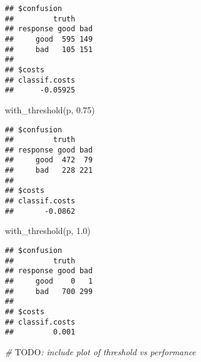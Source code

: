 \documentclass[
]{scrbook}
\newenvironment{Shaded}{\begin{snugshade}}{\end{snugshade}}
\newcommand{\AlertTok}[1]{\textcolor[rgb]{0.94,0.16,0.16}{#1}}
\newcommand{\AttributeTok}[1]{\textcolor[rgb]{0.77,0.63,0.00}{#1}}
\newcommand{\CommentTok}[1]{\textcolor[rgb]{0.56,0.35,0.01}{\textit{#1}}}
\newcommand{\ControlFlowTok}[1]{\textcolor[rgb]{0.13,0.29,0.53}{\textbf{#1}}}
\newcommand{\FloatTok}[1]{\textcolor[rgb]{0.00,0.00,0.81}{#1}}
\newcommand{\FunctionTok}[1]{\textcolor[rgb]{0.00,0.00,0.00}{#1}}
\newcommand{\NormalTok}[1]{#1}
\newcommand{\OtherTok}[1]{\textcolor[rgb]{0.56,0.35,0.01}{#1}}
\newcommand{\SpecialCharTok}[1]{\textcolor[rgb]{0.00,0.00,0.00}{#1}}
\renewenvironment{Shaded} {\begin{snugshade}\small} {\end{snugshade}}
\begin{document}
\begin{Shaded}
\end{Shaded}

\begin{verbatim}
## $confusion
##         truth
## response good bad
##     good  595 149
##     bad   105 151
## 
## $costs
## classif.costs 
##      -0.05925
\end{verbatim}

\begin{Shaded}
\begin{Highlighting}[]
\FunctionTok{with\_threshold}\NormalTok{(p, }\FloatTok{0.75}\NormalTok{)}
\end{Highlighting}
\end{Shaded}

\begin{verbatim}
## $confusion
##         truth
## response good bad
##     good  472  79
##     bad   228 221
## 
## $costs
## classif.costs 
##       -0.0862
\end{verbatim}

\begin{Shaded}
\begin{Highlighting}[]
\FunctionTok{with\_threshold}\NormalTok{(p, }\FloatTok{1.0}\NormalTok{)}
\end{Highlighting}
\end{Shaded}

\begin{verbatim}
## $confusion
##         truth
## response good bad
##     good    0   1
##     bad   700 299
## 
## $costs
## classif.costs 
##         0.001
\end{verbatim}

\begin{Shaded}
\begin{Highlighting}[]
\CommentTok{\# }\AlertTok{TODO}\CommentTok{: include plot of threshold vs performance}
\end{Highlighting}
\end{Shaded}
\end{document}
